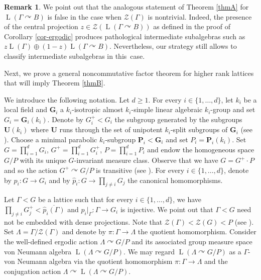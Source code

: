 \documentclass[11pt]{article}
\newcommand{\bG}{\boldsymbol{G}}
\newcommand{\bP}{\boldsymbol{P}}
\newcommand{\bU}{\boldsymbol{U}}
\theoremstyle{definition}
\newtheorem{rem}[thm]{Remark}
\DeclareMathOperator{\rL}{L}
\begin{document}
\begin{rem}
We point out that the analogous statement of Theorem \ref{thmA} for \hbox{$\rL(\Gamma \curvearrowright B)$} is false in the case when $\mathscr Z(\Gamma)$ is nontrivial. Indeed, the presence of the central projection $z \in \mathscr Z(\rL(\Gamma \curvearrowright B))$ as defined in the proof of Corollary \ref{cor-ergodic} produces pathological intermediate subalgebras such as $z \rL(\Gamma) \oplus (1-z)\rL(\Gamma \curvearrowright B)$. Nevertheless, our strategy still allows to classify intermediate subalgebras in this~case.
\end{rem}

Next, we prove a general noncommutative factor theorem for higher rank lattices that will imply Theorem \ref{thmB}.

We introduce the following notation. Let $d \geq 1$. For every $i \in \{1, \dots, d\}$, let $k_i$ be a local field and $\bG_i$ a $k_i$-isotropic almost $k_i$-simple linear algebraic $k_i$-group and set $G_i = \bG_i(k_i)$. Denote by $G_i^+ < G_i$ the subgroup generated by the subgroups $\bU(k_i)$ where $\bU$ runs through the set of unipotent $k_i$-split subgroups of $\bG_i$ (see \cite[Prop.\,I.5.4(i)]{Ma91}). Choose a minimal parabolic $k_i$-subgroup $\bP_i < \bG_i$ and set $P_i = \bP_i(k_i)$.
Set $G = \prod_{i = 1}^d G_i$, $G^+ = \prod_{i = 1}^d G_i^+$, $P = \prod_{i = 1}^d P_i$ and endow the homogeneous space $G/P$ with its unique $G$-invariant measure class. Observe that we have $G = G^+ \cdot P$ and so the action $G^+ \curvearrowright G/P$ is transitive (see \cite[Prop.\,I.5.4(vi)]{Ma91}). For every $i \in \{1, \dots, d\}$, denote by $p_i : G \to G_i$ and by $\widehat p_i : G \to \prod_{j \neq i} G_j$ the canonical homomorphisms.

Let $\Gamma < G$ be a lattice such that for every $i \in \{1, \dots, d\}$, we have $\prod_{j \neq i} G_j^+ < \overline{\widehat p_i(\Gamma)}$ and $p_i|_\Gamma : \Gamma \to G_i$ is injective. We point out that $\Gamma < G$ need not be embedded with dense projections. Note that $\mathscr Z(\Gamma) < \mathscr Z(G) < P$ (see \cite[Lem.\,II.6.3(I)]{Ma91}). Set $\Lambda = \Gamma/\mathscr Z(\Gamma)$ and denote by $\pi : \Gamma \to \Lambda$ the quotient homomorphism. Consider the well-defined ergodic action $\Lambda \curvearrowright G/P$ and its associated group measure space von Neumann algebra $\rL(\Lambda \curvearrowright G/P)$. We may regard $\rL(\Lambda \curvearrowright G/P)$ as a $\Gamma$-von Neumann algebra via the quotient homomorphism $\pi : \Gamma \to \Lambda$ and the conjugation action $\Lambda \curvearrowright \rL(\Lambda \curvearrowright G/P)$.
\end{document}
